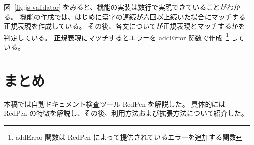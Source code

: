 図~\ref{fig:js-validator} をみると、機能の実装は数行で実現できていることがわかる。
機能の作成では、はじめに漢字の連続が六回以上続いた場合にマッチする正規表現を作成している。
その後、各文についてが正規表現とマッチするかを判定している。
正規表現にマッチするとエラーを addError 関数で作成~\footnote{addError 関数は RedPen によって提供されているエラーを追加する関数} している。

\section{まとめ}
本稿では自動ドキュメント検査ツール RedPen を解説した。
具体的には RedPen の特徴を解説し、その後、利用方法および拡張方法について紹介した。

